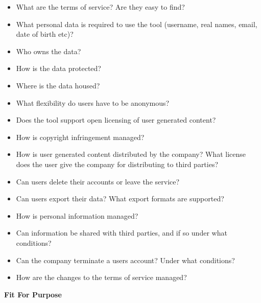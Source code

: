 \documentclass[
]{book}
\providecommand{\tightlist}{%
  \setlength{\itemsep}{0pt}\setlength{\parskip}{0pt}}
\theoremstyle{definition}
\theoremstyle{definition}
\theoremstyle{definition}
\theoremstyle{definition}
\theoremstyle{remark}
\begin{document}
\begin{reflect}
\begin{itemize}
\tightlist
\item
  What are the terms of service? Are they easy to find?\\
\item
  What personal data is required to use the tool (username, real names, email, date of birth etc)?\\
\item
  Who owns the data?\\
\item
  How is the data protected?\\
\item
  Where is the data housed?\\
\item
  What flexibility do users have to be anonymous?\\
\item
  Does the tool support open licensing of user generated content?\\
\item
  How is copyright infringement managed?\\
\item
  How is user generated content distributed by the company? What license does the user give the company for distributing to third parties?\\
\item
  Can users delete their accounts or leave the service?\\
\item
  Can users export their data? What export formats are supported?\\
\item
  How is personal information managed?\\
\item
  Can information be shared with third parties, and if so under what conditions?\\
\item
  Can the company terminate a users account? Under what conditions?\\
\item
  How are the changes to the terms of service managed?
\end{itemize}

\textbf{Fit For Purpose}


\end{reflect}
\end{document}
